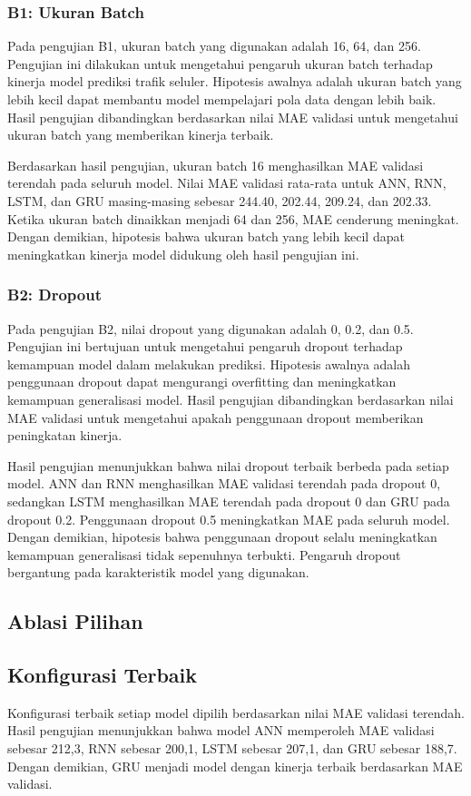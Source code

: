 \documentclass[conference,a4paper]{IEEEtran}
\begin{document}
\subsubsection{B1: Ukuran Batch}
Pada pengujian B1, ukuran batch yang digunakan adalah 16, 64, dan 256. Pengujian ini dilakukan untuk mengetahui pengaruh ukuran batch terhadap kinerja model prediksi trafik seluler. Hipotesis awalnya adalah ukuran batch yang lebih kecil dapat membantu model mempelajari pola data dengan lebih baik. Hasil pengujian dibandingkan berdasarkan nilai MAE validasi untuk mengetahui ukuran batch yang memberikan kinerja terbaik.

Berdasarkan hasil pengujian, ukuran batch 16 menghasilkan MAE validasi terendah pada seluruh model. Nilai MAE validasi rata-rata untuk ANN, RNN, LSTM, dan GRU masing-masing sebesar 244.40, 202.44, 209.24, dan 202.33. Ketika ukuran batch dinaikkan menjadi 64 dan 256, MAE cenderung meningkat. Dengan demikian, hipotesis bahwa ukuran batch yang lebih kecil dapat meningkatkan kinerja model didukung oleh hasil pengujian ini.


\subsubsection{B2: Dropout}
Pada pengujian B2, nilai dropout yang digunakan adalah 0, 0.2, dan 0.5. Pengujian ini bertujuan untuk mengetahui pengaruh dropout terhadap kemampuan model dalam melakukan prediksi. Hipotesis awalnya adalah penggunaan dropout dapat mengurangi overfitting dan meningkatkan kemampuan generalisasi model. Hasil pengujian dibandingkan berdasarkan nilai MAE validasi untuk mengetahui apakah penggunaan dropout memberikan peningkatan kinerja.

Hasil pengujian menunjukkan bahwa nilai dropout terbaik berbeda pada setiap model. ANN dan RNN menghasilkan MAE validasi terendah pada dropout 0, sedangkan LSTM menghasilkan MAE terendah pada dropout 0 dan GRU pada dropout 0.2. Penggunaan dropout 0.5 meningkatkan MAE pada seluruh model. Dengan demikian, hipotesis bahwa penggunaan dropout selalu meningkatkan kemampuan generalisasi tidak sepenuhnya terbukti. Pengaruh dropout bergantung pada karakteristik model yang digunakan.
\subsection{Ablasi Pilihan}

\subsection{Konfigurasi Terbaik}
Konfigurasi terbaik setiap model dipilih berdasarkan nilai MAE validasi terendah. Hasil pengujian menunjukkan bahwa model ANN memperoleh MAE validasi sebesar 212,3, RNN sebesar 200,1, LSTM sebesar 207,1, dan GRU sebesar 188,7. Dengan demikian, GRU menjadi model dengan kinerja terbaik berdasarkan MAE validasi.
\end{document}
